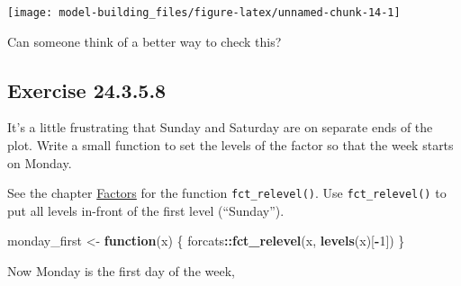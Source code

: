 \documentclass[]{book}
\newenvironment{Shaded}{\begin{snugshade}}{\end{snugshade}}
\newcommand{\ControlFlowTok}[1]{\textcolor[rgb]{0.13,0.29,0.53}{\textbf{#1}}}
\newcommand{\DataTypeTok}[1]{\textcolor[rgb]{0.13,0.29,0.53}{#1}}
\newcommand{\DecValTok}[1]{\textcolor[rgb]{0.00,0.00,0.81}{#1}}
\newcommand{\KeywordTok}[1]{\textcolor[rgb]{0.13,0.29,0.53}{\textbf{#1}}}
\newcommand{\NormalTok}[1]{#1}
\newcommand{\OperatorTok}[1]{\textcolor[rgb]{0.81,0.36,0.00}{\textbf{#1}}}
\newcommand{\OtherTok}[1]{\textcolor[rgb]{0.56,0.35,0.01}{#1}}
\newcommand{\StringTok}[1]{\textcolor[rgb]{0.31,0.60,0.02}{#1}}
\theoremstyle{plain}
\theoremstyle{remark}
\begin{document}
\begin{center}\texttt{[image: model-building\_files/figure-latex/unnamed-chunk-14-1]} \end{center}

Can someone think of a better way to check this?

\hypertarget{exercise-24.3.5.8}{%
\subsection*{\texorpdfstring{Exercise
{24.3.5.8}}{Exercise 24.3.5.8}}\label{exercise-24.3.5.8}}

It's a little frustrating that Sunday and Saturday are on separate ends
of the plot. Write a small function to set the levels of the factor so
that the week starts on Monday.

See the chapter \href{http://r4ds.had.co.nz/factors.html}{Factors} for
the function \texttt{fct\_relevel()}. Use \texttt{fct\_relevel()} to put
all levels in-front of the first level (``Sunday'').

\begin{Shaded}
\begin{Highlighting}[]
\NormalTok{monday_first <-}\StringTok{ }\ControlFlowTok{function}\NormalTok{(x) \{}
\NormalTok{  forcats}\OperatorTok{::}\KeywordTok{fct_relevel}\NormalTok{(x, }\KeywordTok{levels}\NormalTok{(x)[}\OperatorTok{-}\DecValTok{1}\NormalTok{])  }
\NormalTok{\}}
\end{Highlighting}
\end{Shaded}

Now Monday is the first day of the week,

\begin{Shaded}
\end{Shaded}
\end{document}
